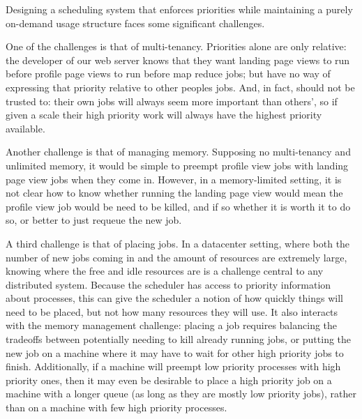 

Designing a scheduling system that enforces priorities while maintaining a
purely on-demand usage structure faces some significant challenges.


One of the challenges is that of multi-tenancy. Priorities alone are only
relative: the developer of our web server knows that they want landing page
views to run before profile page views to run before map reduce jobs; but have
no way of expressing that priority relative to other peoples jobs. And, in fact,
should not be trusted to: their own jobs will always seem more important than
others', so if given a scale their high priority work will always have the
highest priority available.

Another challenge is that of managing memory. Supposing no multi-tenancy and
unlimited memory, it would be simple to preempt profile view jobs with landing
page view jobs when they come in. However, in a memory-limited setting, it is
not clear how to know whether running the landing page view would mean the
profile view job would be need to be killed, and if so whether it is worth it to
do so, or better to just requeue the new job.

A third challenge is that of placing jobs. In a datacenter setting, where both
the number of new jobs coming in and the amount of resources are extremely
large, knowing where the free and idle resources are is a challenge central to
any distributed system. Because the scheduler has access to priority information
about processes, this can give the scheduler a notion of how quickly things will
need to be placed, but not how many resources they will use. It also interacts
with the memory management challenge: placing a job requires balancing the
tradeoffs between potentially needing to kill already running jobs, or putting
the new job on a machine where it may have to wait for other high priority jobs
to finish. Additionally, if a machine will preempt low priority processes with
high priority ones, then it may even be desirable to place a high priority job
on a machine with a longer queue (as long as they are mostly low priority jobs),
rather than on a machine with few high priority processes.


